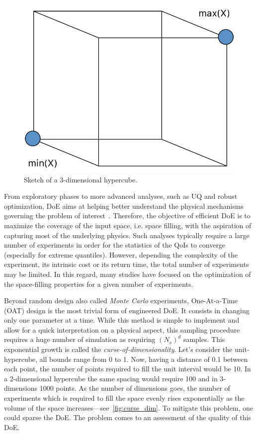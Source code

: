 \begin{figure}[!ht]
\centering
\includegraphics[width=0.5\linewidth,keepaspectratio]{fig/literature/hypercube.pdf}
\caption{Sketch of a 3-dimensional hypercube.}
\label{fig:sketch_hypercube}
\end{figure}

From exploratory phases to more advanced analyses, such as UQ and robust optimization, DoE aims at helping better understand the physical mechanisms governing the problem of interest~\citep{Saltelli2007}. Therefore, the objective of efficient DoE is to maximize the coverage of the input space, i.e. space filling, with the aspiration of capturing most of the underlying physics. Such analyses typically require a large number of experiments in order for the statistics of the QoIs to converge (especially for extreme quantiles). However, depending the complexity of the experiment, its intrinsic cost or its return time, the total number of experiments may be limited. In this regard, many studies have focused on the optimization of the space-filling properties for a given number of experiments.

Beyond random design also called \emph{Monte Carlo} experiments, One-At-a-Time (OAT) design is the most trivial form of engineered DoE. It consists in changing only one parameter at a time. While this method is simple to implement and allow for a quick interpretation on a physical aspect, this sampling procedure requires a huge number of simulation as requiring $(N_s)^d$ samples. This exponential growth is called the \emph{curse-of-dimensionality}. Let's consider the unit-hypercube, all bounds range from 0 to 1. Now, having a distance of 0.1 between each point, the number of points required to fill the unit interval would be 10. In a 2-dimensional hypercube the same spacing would require 100 and in 3-dimensions 1000 points. As the number of dimensions goes, the number of experiments which is required to fill the space evenly rises exponentially as the volume of the space increases---see~\cref{fig:curse_dim}. To mitigate this problem, one could sparse the DoE. The problem comes to an assessment of the quality of this DoE.

